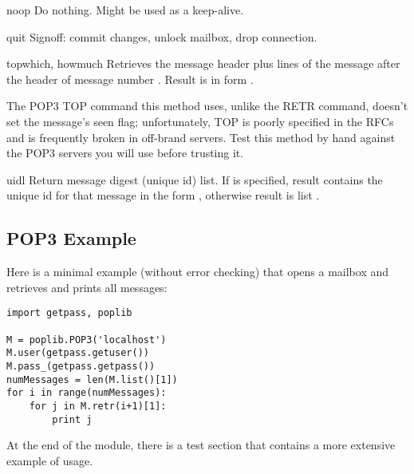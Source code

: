 \begin{methoddesc}{noop}{}
Do nothing.  Might be used as a keep-alive.
\end{methoddesc}

\begin{methoddesc}{quit}{}
Signoff:  commit changes, unlock mailbox, drop connection.
\end{methoddesc}

\begin{methoddesc}{top}{which, howmuch}
Retrieves the message header plus  lines of the message
after the header of message number . Result is in form 
.

The POP3 TOP command this method uses, unlike the RETR command,
doesn't set the message's seen flag; unfortunately, TOP is poorly
specified in the RFCs and is frequently broken in off-brand servers.
Test this method by hand against the POP3 servers you will use before
trusting it.
\end{methoddesc}

\begin{methoddesc}{uidl}{}
Return message digest (unique id) list.
If  is specified, result contains the unique id for that
message in the form ,
otherwise result is list .
\end{methoddesc}

\begin{seealso}
\end{seealso}

\subsection{POP3 Example \label{pop3-example}}

Here is a minimal example (without error checking) that opens a
mailbox and retrieves and prints all messages:

\begin{verbatim}
import getpass, poplib

M = poplib.POP3('localhost')
M.user(getpass.getuser())
M.pass_(getpass.getpass())
numMessages = len(M.list()[1])
for i in range(numMessages):
    for j in M.retr(i+1)[1]:
        print j
\end{verbatim}

At the end of the module, there is a test section that contains a more
extensive example of usage.
